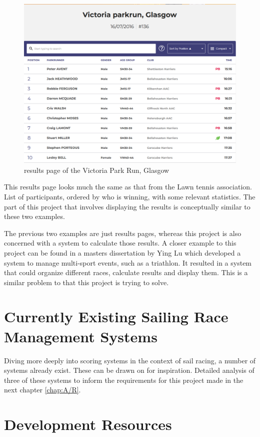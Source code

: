 \documentclass{l4proj}
\begin{document}
\begin{figure}[h!]
    \centering
    \includegraphics[width=0.6\linewidth]{images/ParkRun.png} 

    \caption{results page of the Victoria Park Run, Glasgow \citep{Parkrun}
    }

    \label{fig:parkrun} 
\end{figure}

This results page looks much the same as that from the Lawn tennis association. List of participants, ordered by who is winning, with some relevant statistics. The part of this project that involves displaying the results is conceptually similar to these two examples.

The previous two examples are just results pages, whereas this project is also concerned with a system to calculate those results. A closer example to this project can be found in a masters dissertation by Ying Lu \citet{Multi-sport} which developed a system to manage multi-sport events, such as a triathlon. It resulted in a system that could organize different races, calculate results and display them. This is a similar problem to that this project is trying to solve.

\section{Currently Existing Sailing Race Management Systems}
Diving more deeply into scoring systems in the context of sail racing, a number of systems already exist. These can be drawn on for inspiration. Detailed analysis of three of these systems to inform the requirements for this project made in the next chapter \autoref{chap:A/R}.

\section{Development Resources}
\end{document}
